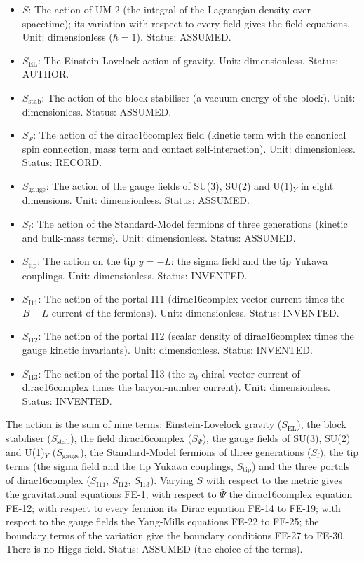 \documentclass[
  10pt,
]{article}
\providecommand{\tightlist}{%
  \setlength{\itemsep}{0pt}\setlength{\parskip}{0pt}}
\begin{document}
\begin{itemize}
\tightlist
\item
  \(S\): The action of UM-2 (the integral of the Lagrangian density over
  spacetime); its variation with respect to every field gives the field
  equations. Unit: dimensionless (\(\hbar = 1\)). Status: ASSUMED.
\item
  \(S_{\mathrm{EL}}\): The Einstein-Lovelock action of gravity. Unit:
  dimensionless. Status: AUTHOR.
\item
  \(S_{\mathrm{stab}}\): The action of the block stabiliser (a vacuum
  energy of the block). Unit: dimensionless. Status: ASSUMED.
\item
  \(S_\Psi\): The action of the dirac16complex field (kinetic term with
  the canonical spin connection, mass term and contact
  self-interaction). Unit: dimensionless. Status: RECORD.
\item
  \(S_{\mathrm{gauge}}\): The action of the gauge fields of SU(3), SU(2)
  and U(1)\(_Y\) in eight dimensions. Unit: dimensionless. Status:
  ASSUMED.
\item
  \(S_{\mathrm{f}}\): The action of the Standard-Model fermions of three
  generations (kinetic and bulk-mass terms). Unit: dimensionless.
  Status: ASSUMED.
\item
  \(S_{\mathrm{tip}}\): The action on the tip \(y = -L\): the sigma
  field and the tip Yukawa couplings. Unit: dimensionless. Status:
  INVENTED.
\item
  \(S_{\mathrm{I11}}\): The action of the portal I11 (dirac16complex
  vector current times the \(B - L\) current of the fermions). Unit:
  dimensionless. Status: INVENTED.
\item
  \(S_{\mathrm{I12}}\): The action of the portal I12 (scalar density of
  dirac16complex times the gauge kinetic invariants). Unit:
  dimensionless. Status: INVENTED.
\item
  \(S_{\mathrm{I13}}\): The action of the portal I13 (the \(x_0\)-chiral
  vector current of dirac16complex times the baryon-number current).
  Unit: dimensionless. Status: INVENTED.
\end{itemize}

The action is the sum of nine terms: Einstein-Lovelock gravity
(\(S_{\mathrm{EL}}\)), the block stabiliser (\(S_{\mathrm{stab}}\)), the
field dirac16complex (\(S_\Psi\)), the gauge fields of SU(3), SU(2) and
U(1)\(_Y\) (\(S_{\mathrm{gauge}}\)), the Standard-Model fermions of
three generations (\(S_{\mathrm{f}}\)), the tip terms (the sigma field
and the tip Yukawa couplings, \(S_{\mathrm{tip}}\)) and the three
portals of dirac16complex (\(S_{\mathrm{I11}}\), \(S_{\mathrm{I12}}\),
\(S_{\mathrm{I13}}\)). Varying \(S\) with respect to the metric gives
the gravitational equations FE-1; with respect to \(\bar\Psi\) the
dirac16complex equation FE-12; with respect to every fermion its Dirac
equation FE-14 to FE-19; with respect to the gauge fields the Yang-Mills
equations FE-22 to FE-25; the boundary terms of the variation give the
boundary conditions FE-27 to FE-30. There is no Higgs field. Status:
ASSUMED (the choice of the terms).
\end{document}
